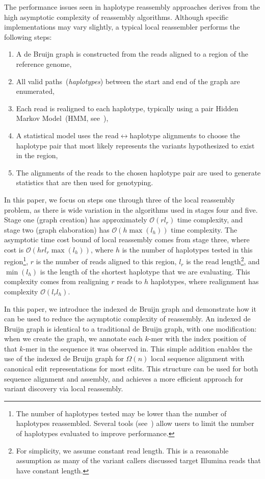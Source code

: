 \documentclass{bioinfo}
\begin{document}
The performance issues seen in haplotype reassembly approaches derives from the high asymptotic
complexity of reassembly algorithms. Although specific implementations may vary slightly, a typical
local reassembler performs the following steps:

\begin{enumerate}
\item A de Bruijn graph is constructed from the reads aligned to a region of the reference genome,
\item All valid paths~(\emph{haplotypes}) between the start and end of the graph are enumerated,
\item Each read is realigned to each haplotype, typically using a pair Hidden Markov Model~(HMM,
see~\citet{durbin98}),
\item A statistical model uses the read$\leftrightarrow$haplotype alignments to choose the haplotype pair
that most likely represents the variants hypothesized to exist in the region, 
\item The alignments of the reads to the chosen haplotype pair are used to generate statistics that are
then used for genotyping.
\end{enumerate}

In this paper, we focus on steps one through three of the local reassembly problem, as there is wide
variation in the algorithms used in stages four and five. Stage one (graph
creation) has approximately $\mathcal{O}(r l_r)$ time complexity, and stage two (graph elaboration) has
$\mathcal{O}(h \max(l_h))$ time complexity.
The asymptotic time cost bound of local reassembly comes from stage three, where cost is $\mathcal{O}(h r l_r
\max(l_h))$, where $h$ is the number of haplotypes tested in this region\footnote{The number of
haplotypes tested may be lower than the number of haplotypes reassembled. Several tools
(see~\citet{depristo11, garrison12}) allow users to limit the number of haplotypes evaluated to improve
performance.}, $r$ is the number of reads aligned to this region, $l_r$ is the read length\footnote{For
simplicity, we assume constant read length. This is a reasonable assumption as many of the variant
callers discussed target Illumina reads that have constant length.}, and $\min(l_h)$ is the length of the
shortest haplotype that we are evaluating. This complexity comes from realigning $r$ reads to $h$
haplotypes, where realignment has complexity $\mathcal{O}(l_r l_h)$.

In this paper, we introduce the indexed de Bruijn graph and demonstrate how it can be used to
reduce the asymptotic complexity of reassembly. An indexed de Bruijn graph is identical to a
traditional de Bruijn graph, with one modification: when we create the graph, we annotate each
$k$-mer with the index position of that $k$-mer in the sequence it was observed in. This simple addition
enables the use of the indexed de Bruijn graph for $\Omega(n)$ local sequence alignment with
canonical edit representations for most edits. This structure can be used for both sequence alignment and
assembly, and achieves a more efficient approach for variant discovery via local reassembly.
\end{document}
